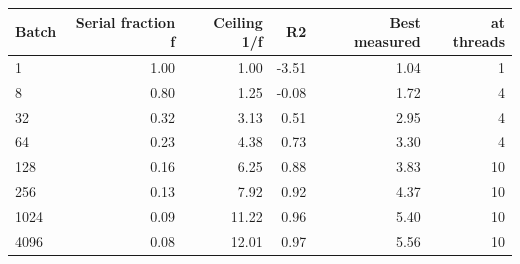 \begin{tabular}{lrrrrr}
\toprule
Batch & Serial fraction f & Ceiling 1/f & R2 & Best measured & at threads \\
\midrule
1 & 1.00 & 1.00 & -3.51 & 1.04 & 1 \\
8 & 0.80 & 1.25 & -0.08 & 1.72 & 4 \\
32 & 0.32 & 3.13 & 0.51 & 2.95 & 4 \\
64 & 0.23 & 4.38 & 0.73 & 3.30 & 4 \\
128 & 0.16 & 6.25 & 0.88 & 3.83 & 10 \\
256 & 0.13 & 7.92 & 0.92 & 4.37 & 10 \\
1024 & 0.09 & 11.22 & 0.96 & 5.40 & 10 \\
4096 & 0.08 & 12.01 & 0.97 & 5.56 & 10 \\
\bottomrule
\end{tabular}
